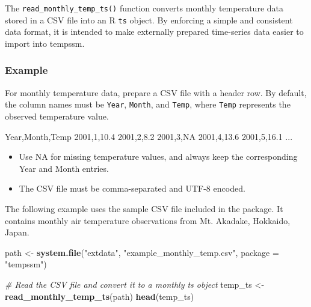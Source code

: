 \documentclass[
]{article}
\newenvironment{Shaded}{\begin{snugshade}}{\end{snugshade}}
\newcommand{\AttributeTok}[1]{\textcolor[rgb]{0.13,0.29,0.53}{#1}}
\newcommand{\CommentTok}[1]{\textcolor[rgb]{0.56,0.35,0.01}{\textit{#1}}}
\newcommand{\FunctionTok}[1]{\textcolor[rgb]{0.13,0.29,0.53}{\textbf{#1}}}
\newcommand{\NormalTok}[1]{#1}
\newcommand{\OtherTok}[1]{\textcolor[rgb]{0.56,0.35,0.01}{#1}}
\newcommand{\StringTok}[1]{\textcolor[rgb]{0.31,0.60,0.02}{#1}}
\providecommand{\tightlist}{%
  \setlength{\itemsep}{0pt}\setlength{\parskip}{0pt}}
\begin{document}
The \texttt{read\_monthly\_temp\_ts()} function converts monthly
temperature data stored in a CSV file into an R \texttt{ts} object. By
enforcing a simple and consistent data format, it is intended to make
externally prepared time-series data easier to import into tempssm.

\subsubsection{Example}\label{example}

For monthly temperature data, prepare a CSV file with a header row. By
default, the column names must be \texttt{Year}, \texttt{Month}, and
\texttt{Temp}, where \texttt{Temp} represents the observed temperature
value.

\begin{Shaded}
\begin{Highlighting}[]
\NormalTok{Year,Month,Temp}
\NormalTok{2001,1,10.4}
\NormalTok{2001,2,8.2}
\NormalTok{2001,3,NA}
\NormalTok{2001,4,13.6}
\NormalTok{2001,5,16.1}
\NormalTok{...}
\end{Highlighting}
\end{Shaded}

\begin{itemize}
\tightlist
\item
  Use NA for missing temperature values, and always keep the
  corresponding Year and Month entries.
\item
  The CSV file must be comma-separated and UTF-8 encoded.
\end{itemize}

The following example uses the sample CSV file included in the package.
It contains monthly air temperature observations from Mt. Akadake,
Hokkaido, Japan.

\begin{Shaded}
\begin{Highlighting}[]
\NormalTok{path }\OtherTok{\textless{}{-}} \FunctionTok{system.file}\NormalTok{(}\StringTok{"extdata"}\NormalTok{, }\StringTok{"example\_monthly\_temp.csv"}\NormalTok{, }\AttributeTok{package =} \StringTok{"tempssm"}\NormalTok{)}

\CommentTok{\# Read the CSV file and convert it to a monthly ts object}
\NormalTok{temp\_ts }\OtherTok{\textless{}{-}} \FunctionTok{read\_monthly\_temp\_ts}\NormalTok{(path)}
\FunctionTok{head}\NormalTok{(temp\_ts)}
\end{Highlighting}
\end{Shaded}
\end{document}
